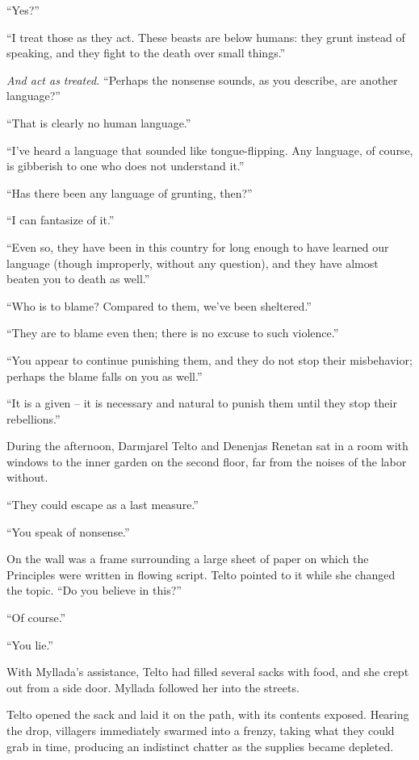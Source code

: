``Yes?''

``I treat those as they act. These beasts are below humans: they grunt instead of speaking, and they fight to the death over small things.''

\emph{And act as treated.} ``Perhaps the nonsense sounds, as you describe, are another language?''

``That is clearly no human language.''

``I've heard a language that sounded like tongue-flipping. Any language, of course, is gibberish to one who does not understand it.''

``Has there been any language of grunting, then?''

``I can fantasize of it.''

``Even so, they have been in this country for long enough to have learned our language (though improperly, without any question), and they have almost beaten you to death as well.''

``Who is to blame? Compared to them, we've been sheltered.''

``They are to blame even then; there is no excuse to such violence.''

``You appear to continue punishing them, and they do not stop their misbehavior; perhaps the blame falls on you as well.''

``It is a given -- it is necessary and natural to punish them until they stop their rebellions.''

During the afternoon, Darmjarel Telto and Denenjas Renetan sat in a room with windows to the inner garden on the second floor, far from the noises of the labor without.

``They could escape as a last measure.''

``You speak of nonsense.''

On the wall was a frame surrounding a large sheet of paper on which the Principles were written in flowing script. Telto pointed to it while she changed the topic. ``Do you believe in this?''

``Of course.''

``You lie.''

\centeredstars

With Myllada's assistance, Telto had filled several sacks with food, and she crept out from a side door. Myllada followed her into the streets.

Telto opened the sack and laid it on the path, with its contents exposed. Hearing the drop, villagers immediately swarmed into a frenzy, taking what they could grab in time, producing an indistinct chatter as the supplies became depleted.

